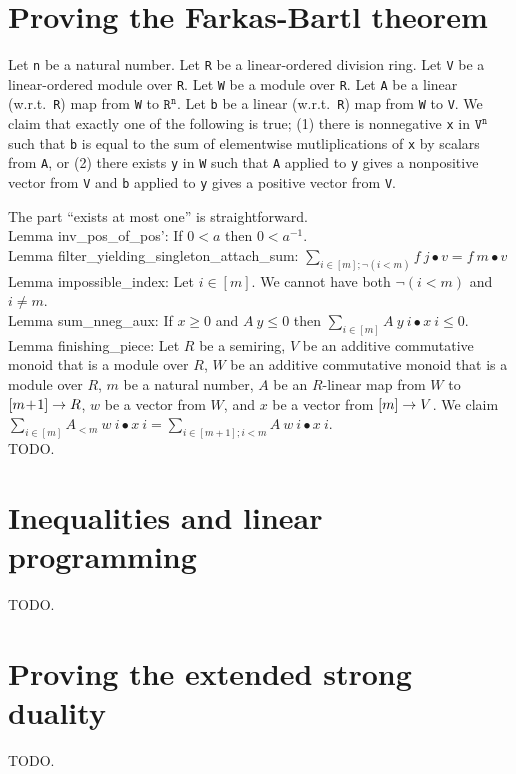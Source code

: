 \documentclass[]{article}
\begin{document}
\section {Proving the Farkas-Bartl theorem}

Let \texttt{n} be a natural number.
Let \texttt{R} be a linear-ordered division ring.
Let \texttt{V} be a linear-ordered module over \texttt{R}.
Let \texttt{W} be a module over \texttt{R}.
Let \texttt{A} be a linear (w.r.t.~\texttt{R}) map from \texttt{W} to $\texttt{R}^{\texttt{n}}$.
Let \texttt{b} be a linear (w.r.t.~\texttt{R}) map from \texttt{W} to \texttt{V}.
We claim that exactly one of the following is true;
(1) there is nonnegative \texttt{x} in $\texttt{V}^{\texttt{n}}$ such that \texttt{b} is equal to
the sum of elementwise mutliplications of \texttt{x} by scalars from \texttt{A}, or
(2) there exists \texttt{y} in \texttt{W} such that \texttt{A} applied to \texttt{y}
gives a nonpositive vector from \texttt{V} and \texttt{b} applied to \texttt{y} gives
a positive vector from \texttt{V}.

The part ``exists at most one'' is straightforward.\\
Lemma inv\_pos\_of\_pos': If $0 < a$ then $0 < a^{-1}$. \\
Lemma filter\_yielding\_singleton\_attach\_sum:
$ \sum_{i \in [m]; \neg (i < m)} f~j \bullet v = f~m \bullet v $ \\
Lemma impossible\_index: Let $i \in [m]$. We cannot have both $\neg (i < m)$ and $i \neq m$. \\
Lemma sum\_nneg\_aux: If $x \ge 0$ and $A~y \le 0$ then $ \sum_{i \in [m]} A~y~i \bullet x~i \le 0 $. \\
Lemma finishing\_piece: Let $R$ be a semiring,
$V$ be an additive commutative monoid that is a module over $R$, 
$W$ be an additive commutative monoid that is a module over $R$,
$m$ be a natural number,
$A$ be an $R$-linear map from $W$ to $[m\!+\!1] \rightarrow R$,
$w$ be a vector from $W$, and
$x$ be a vector from $[m] \rightarrow V$.
We claim $ \sum_{i \in [m]} A_{<m}~w~i \bullet x~i = \sum_{i \in [m\!+\!1]; i < m} A~w~i \bullet x~i $. \\
TODO.


\section {Inequalities and linear programming}

TODO.


\section {Proving the extended strong duality}

TODO.
\end{document}
